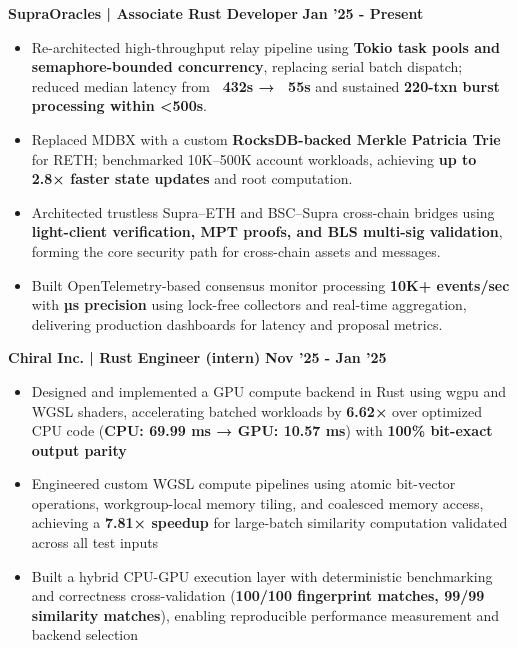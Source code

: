 \documentclass[11pt,a4paper]{article}
\newcommand{\job}[3]{
  \textbf{#1 | #2} \hfill \textbf{#3}
}
\begin{document}
\job{SupraOracles}{Associate Rust Developer}{Jan '25 - Present}
{\footnotesize
\begin{itemize}
    \item Re-architected high-throughput relay pipeline using \textbf{Tokio task pools and semaphore-bounded concurrency}, replacing serial batch dispatch; reduced median latency from \textbf{~432s → ~55s} and sustained \textbf{220-txn burst processing within <500s}.

    \item Replaced MDBX with a custom \textbf{RocksDB-backed Merkle Patricia Trie} for RETH; benchmarked 10K–500K account workloads, achieving \textbf{up to 2.8× faster state updates} and root computation.

    \item Architected trustless Supra–ETH and BSC–Supra cross-chain bridges using \textbf{light-client verification, MPT proofs, and BLS multi-sig validation}, forming the core security path for cross-chain assets and messages.

    \item Built OpenTelemetry-based consensus monitor processing \textbf{10K+ events/sec} with \textbf{µs precision} using lock-free collectors and real-time aggregation, delivering production dashboards for latency and proposal metrics.

\end{itemize}
}

\job{Chiral Inc.}{Rust Engineer (intern)}{Nov '25 - Jan '25}
{\footnotesize
\begin{itemize}


    \item Designed and implemented a GPU compute backend in Rust using wgpu and WGSL shaders, accelerating batched workloads by \textbf{6.62×} over optimized CPU code (\textbf{CPU: 69.99 ms → GPU: 10.57 ms}) with \textbf{100\% bit-exact output parity}

    \item Engineered custom WGSL compute pipelines using atomic bit-vector operations, workgroup-local memory tiling, and coalesced memory access, achieving a \textbf{7.81× speedup} for large-batch similarity computation validated across all test inputs

    \item Built a hybrid CPU-GPU execution layer with deterministic benchmarking and correctness cross-validation (\textbf{100/100 fingerprint matches, 99/99 similarity matches}), enabling reproducible performance measurement and backend selection

\end{itemize}
}
\end{document}
